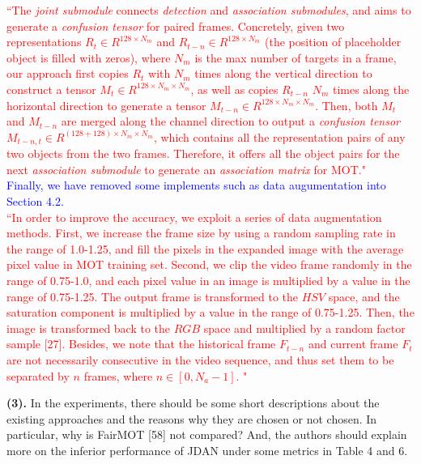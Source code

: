 \documentclass[12pt,journal,onecolumn]{IEEEtran}
\begin{document}
\textcolor{red}{
``The \emph{joint submodule} connects \emph{detection} and \emph{association submodules}, and aims to generate a \emph{confusion tensor} for paired frames.
Concretely, given two representations $R_t \in {R}^{128 \times N_m}$ and $R_{t-n} \in {R}^{128 \times N_m}$ (the position of placeholder object is filled with zeros), where $N_m$ is the max number of targets in a frame, our approach first copies $R_t$ with $N_m$ times along the vertical direction to construct a tensor $M_t \in {R}^{128 \times N_m \times N_m}$, as well as copies $R_{t-n}$ $N_m$ times along the horizontal direction to generate a tensor $M_{t-n} \in {R}^{128 \times N_m \times N_m}$. Then, both $M_t$ and $M_{t-n}$ are merged along the channel direction to output a \emph{confusion tensor} $M_{t-n,t} \in {R}^{(128 + 128) \times N_m \times N_m}$, which contains all the representation pairs of any two objects from the two frames.
Therefore, it offers all the object pairs for the next \emph{association submodule} to generate an \emph{association matrix} for MOT."
} \\
\textcolor{blue}{
Finally, we have removed some implements such as data augumentation into Section 4.2.
}\\
\textcolor{red}{
``In order to improve the accuracy, we exploit a series of data augmentation methods.
First, we increase the frame size by using a random sampling rate in the range of 1.0-1.25, 
and fill the pixels in the expanded image with the average pixel value in MOT training set. 
\textcolor{red}{Second,} we clip the video frame randomly in the range of 0.75-1.0,
and each pixel value in an image is multiplied by a value in the range of 0.75-1.25. 
The output frame is transformed to the $HSV$ space, 
and the saturation component is multiplied by a value in the range of 0.75-1.25. 
\textcolor{red}{Then,} the image is transformed back to the $RGB$ space and multiplied by a random factor sample [27]. 
Besides, we note that the historical frame $F_{t-n}$ and current frame $F_t$ are not necessarily consecutive in the video sequence,
and thus set them to be separated by $n$ frames, where $n \in [0, N_a-1] $. 
"
} \\


\vspace{8pt}
\vspace{8pt} 


\textbf{(3).} In the experiments, there should be some short descriptions about the existing approaches and the reasons why they are chosen or not chosen. 
In particular, why is FairMOT [58] not compared? 
And, the authors should explain more on the inferior performance of JDAN under some metrics in Table 4 and 6.
\end{document}
